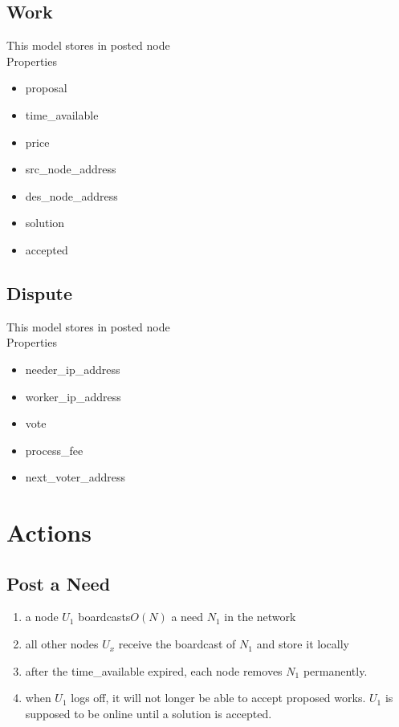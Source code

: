 \documentclass[12pt]{article}
\begin{document}
\subsection{Work}
This model stores in posted node\\
Properties
\begin{itemize}
	\item proposal
	\item time\_available
	\item price
	\item src\_node\_address
	\item des\_node\_address
	\item solution
	\item accepted
\end{itemize}

\subsection{Dispute}
This model stores in posted node\\
Properties
\begin{itemize}
	\item needer\_ip\_address
	\item worker\_ip\_address
	\item vote
	\item process\_fee
	\item next\_voter\_address
\end{itemize}

\section{Actions}

\subsection{Post a Need}
\begin{enumerate}
	\item a node $U_1$ boardcasts$O(N)$ a need $N_1$ in the network
	\item all other nodes $U_x$ receive the boardcast of $N_1$ and store it locally
	\item after the time\_available expired, each node removes $N_1$ permanently.
	\item when $U_1$ logs off, it will not longer be able to accept proposed works. $U_1$ is supposed to be online until a solution is accepted.  
\end{enumerate}
\end{document}
